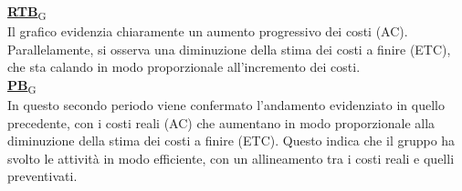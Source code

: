 \begin{flushleft}
\href{https://7last.github.io/docs/pb/documentazione-interna/glossario\#requirements-and-technology-baseline}{\textbf{RTB}\textsubscript{G}} \\
Il grafico evidenzia chiaramente un aumento progressivo dei costi (AC). Parallelamente, si osserva una diminuzione della stima dei costi a finire (ETC), che sta calando in modo proporzionale all'incremento dei costi. \\
\href{https://7last.github.io/docs/pb/documentazione-interna/glossario\#product-baseline}{\textbf{PB}\textsubscript{G}} \\
In questo secondo periodo viene confermato l'andamento evidenziato in quello precedente, con i costi reali (AC) che aumentano in modo proporzionale alla diminuzione della stima dei costi a finire (ETC). Questo indica che il gruppo ha svolto le attività in modo efficiente, con un allineamento tra i costi reali e quelli preventivati.
\end{flushleft}

\newpage
